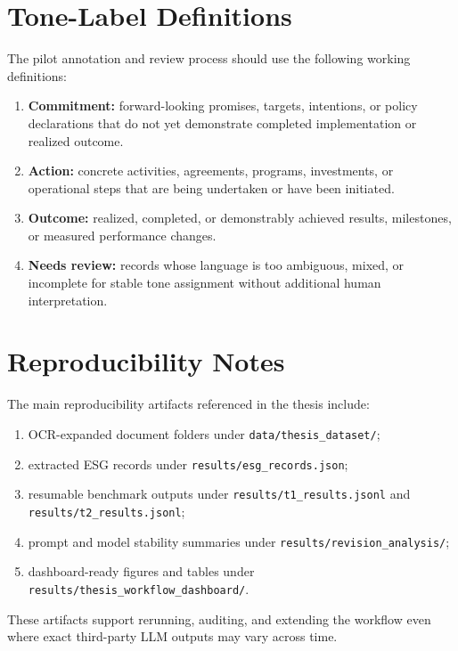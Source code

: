 \documentclass[english, online, cse, master]{dithesis}
\providecommand{\tightlist}{\setlength{\itemsep}{0pt}\setlength{\parskip}{0pt}}
\begin{document}
\section{Tone-Label Definitions}\label{tone-label-definitions}

The pilot annotation and review process should use the following working definitions:

\begin{enumerate}
\def\labelenumi{\arabic{enumi}.}
\tightlist
\item
  \textbf{Commitment:} forward-looking promises, targets, intentions, or policy declarations that do not yet demonstrate completed implementation or realized outcome.
\item
  \textbf{Action:} concrete activities, agreements, programs, investments, or operational steps that are being undertaken or have been initiated.
\item
  \textbf{Outcome:} realized, completed, or demonstrably achieved results, milestones, or measured performance changes.
\item
  \textbf{Needs review:} records whose language is too ambiguous, mixed, or incomplete for stable tone assignment without additional human interpretation.
\end{enumerate}

\section{Reproducibility Notes}\label{reproducibility-notes}

The main reproducibility artifacts referenced in the thesis include:

\begin{enumerate}
\def\labelenumi{\arabic{enumi}.}
\tightlist
\item
  OCR-expanded document folders under \texttt{data/thesis\_dataset/};
\item
  extracted ESG records under \texttt{results/esg\_records.json};
\item
  resumable benchmark outputs under \texttt{results/t1\_results.jsonl} and \texttt{results/t2\_results.jsonl};
\item
  prompt and model stability summaries under \texttt{results/revision\_analysis/};
\item
  dashboard-ready figures and tables under \texttt{results/thesis\_workflow\_dashboard/}.
\end{enumerate}

These artifacts support rerunning, auditing, and extending the workflow even where exact third-party LLM outputs may vary across time.
\end{document}

